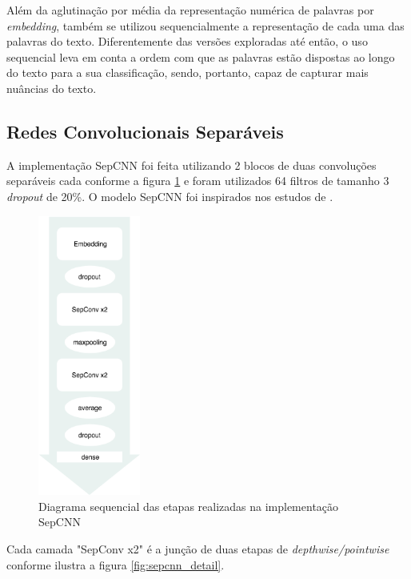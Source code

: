 Além da aglutinação por média da representação numérica de palavras por \textit{embedding}, também se utilizou sequencialmente a representação de cada uma das palavras do texto. Diferentemente das versões exploradas até então, o uso sequencial leva em conta a ordem com que as palavras estão dispostas ao longo do texto para a sua classificação, sendo, portanto, capaz de capturar mais nuâncias do texto.

\subsection{Redes Convolucionais Separáveis}

A implementação SepCNN foi feita utilizando 2 blocos de duas convoluções separáveis cada conforme a figura \ref{fig:sepcnn_overview} e foram utilizados 64 filtros de tamanho 3 \textit{dropout} de 20\%. O modelo SepCNN foi inspirados nos estudos de \cite{DBLP:journals/corr/Chollet16a}.

\begin{figure}[!ht]
	\centering
	\includegraphics[width=0.3\textwidth]{figures/sepcnn_overview.png}
	\caption{Diagrama sequencial das etapas realizadas na implementação SepCNN}
	\label{fig:sepcnn_overview}
\end{figure}

Cada camada "SepConv x2" é a junção de duas etapas de \textit{depthwise/pointwise} conforme ilustra a figura \ref{fig:sepcnn_detail}.


